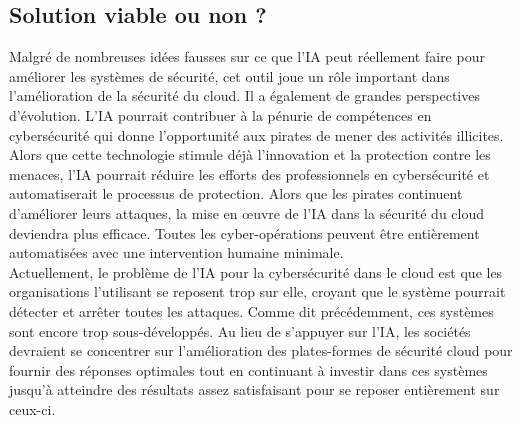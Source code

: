 \documentclass[a4paper, 12pt]{article}
\begin{document}
\begin{spacing}{1.1}
    \subsection{Solution viable ou non ?}
      Malgré de nombreuses idées fausses sur ce que l'IA peut réellement
      faire pour améliorer les systèmes de sécurité, cet outil joue un rôle
      important dans l'amélioration de la sécurité du cloud. Il a également de
      grandes perspectives d’évolution. L’IA pourrait contribuer à la pénurie de
      compétences en cybersécurité qui donne l'opportunité aux pirates de mener
      des activités illicites. Alors que cette technologie stimule déjà
      l'innovation et la protection contre les menaces, l'IA pourrait réduire
      les efforts des professionnels en cybersécurité et automatiserait le
      processus de protection. Alors que les pirates continuent d'améliorer
      leurs attaques, la mise en œuvre de l'IA dans la sécurité du cloud
      deviendra plus efficace. Toutes les cyber-opérations peuvent être
      entièrement automatisées avec une intervention humaine minimale. \\

      Actuellement, le problème de l’IA pour la cybersécurité dans le cloud est
      que les organisations l’utilisant se reposent trop sur elle, croyant que
      le système pourrait détecter et arrêter toutes les attaques. Comme dit
      précédemment, ces systèmes sont encore trop sous-développés. Au lieu de
      s'appuyer sur l’IA, les sociétés devraient se concentrer sur
      l'amélioration des plates-formes de sécurité cloud pour fournir des
      réponses optimales tout en continuant à investir dans ces systèmes jusqu’à
      atteindre des résultats assez satisfaisant pour se reposer entièrement sur
      ceux-ci.


\end{spacing}
\end{document}
